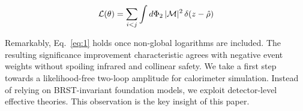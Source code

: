 \begin{equation}
  \mathcal{L}(\theta) = \sum_{i<j} \int d\Phi_{2} \, |\mathcal{M}|^2 \, \delta(z - \hat{\rho})
  \label{eq:5}
\end{equation}

Remarkably, Eq.~\eqref{eq:1} holds once non-global logarithms are
included. The resulting significance improvement characteristic agrees
with negative event weights without spoiling infrared and collinear
safety. We take a first step towards a likelihood-free two-loop
amplitude for calorimeter simulation. Instead of relying on
BRST-invariant foundation models, we exploit detector-level effective
theories. This observation is the key insight of this paper.

